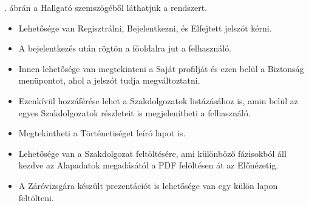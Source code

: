 \documentclass[a4paper,12pt]{article}
\begin{document}
. ábrán a Hallgató szemszögéből láthatjuk a rendszert. 

\begin{itemize}
	\item Lehetősége van Regisztrálni, Bejelentkezni, és Elfejtett jelszót kérni. 
	\item A bejelentkezés után rögtön a főoldalra jut a felhasználó. 
	\item Innen lehetősége van megtekinteni a Saját profilját és ezen belül a Biztonság menüpontot, ahol a jelszót tudja megváltoztatni. 
	\item Ezenkívül hozzáférése lehet a Szakdolgozatok listázásához is, amin belül az egyes Szakdolgozatok részleteit is megjelenítheti a felhasználó. 
	\item Megtekintheti a Történetiséget leíró lapot is. 
	\item Lehetősége van a Szakdolgozat feltöltésére, ami különböző fázisokból áll kezdve az Alapadatok megadásától a PDF felöltésen át az Előnézetig. 
	\item A Záróvizsgára készült prezentációt is lehetősége van egy külön lapon feltölteni.
\end{itemize}

\end{document}
